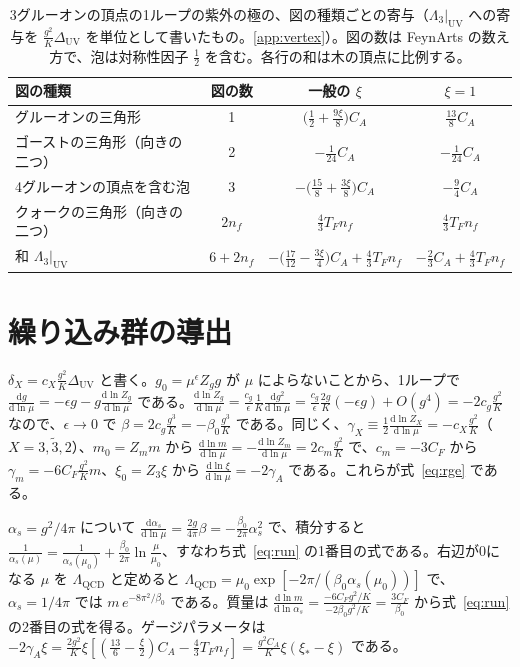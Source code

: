 \documentclass[a4paper,10pt]{ltjsarticle}
\newcommand{\dd}{\mathrm{d}}
\newcommand{\DUV}{\Delta_{\mathrm{UV}}}
\begin{document}
\begin{table}[htbp]
\centering\small
\caption{3グルーオンの頂点の1ループの紫外の極の、図の種類ごとの寄与（$\Lambda_3|_{\mathrm{UV}}$ への寄与を $\frac{g^2}K\DUV$ を単位として書いたもの。\ref{app:vertex}）。図の数は FeynArts の数え方で、泡は対称性因子 $\frac12$ を含む。各行の和は木の頂点に比例する。}
\label{tab:v3class}
\begin{tabular}{lccc}
\toprule
図の種類 & 図の数 & 一般の $\xi$ & $\xi=1$ \\
\midrule
グルーオンの三角形 & 1 & $\bigl(\frac12+\frac{9\xi}8\bigr)C_A$ & $\frac{13}8C_A$ \\
ゴーストの三角形（向きの二つ） & 2 & $-\frac1{24}C_A$ & $-\frac1{24}C_A$ \\
4グルーオンの頂点を含む泡 & 3 & $-\bigl(\frac{15}8+\frac{3\xi}8\bigr)C_A$ & $-\frac94C_A$ \\
クォークの三角形（向きの二つ） & $2n_f$ & $\frac43T_Fn_f$ & $\frac43T_Fn_f$ \\
\midrule
和 $\Lambda_3|_{\mathrm{UV}}$ & $6+2n_f$ & $-\bigl(\frac{17}{12}-\frac{3\xi}4\bigr)C_A+\frac43T_Fn_f$ & $-\frac23C_A+\frac43T_Fn_f$ \\
\bottomrule
\end{tabular}
\end{table}

\section{繰り込み群の導出}\label{app:rg}

$\delta_X=c_X\frac{g^2}{K}\DUV$ と書く。$g_0=\mu^\epsilon Z_gg$ が $\mu$ によらないことから、1ループで $\frac{\dd g}{\dd\ln\mu}=-\epsilon g-g\frac{\dd\ln Z_g}{\dd\ln\mu}$ である。$\frac{\dd\ln Z_g}{\dd\ln\mu}=\frac{c_g}{\epsilon}\frac{1}{K}\frac{\dd g^2}{\dd\ln\mu}=\frac{c_g}{\epsilon}\frac{2g}{K}(-\epsilon g)+O(g^4)=-2c_g\frac{g^2}K$ なので、$\epsilon\to0$ で $\beta=2c_g\frac{g^3}K=-\beta_0\frac{g^3}K$ である。同じく、$\gamma_X\equiv\frac12\frac{\dd\ln Z_X}{\dd\ln\mu}=-c_X\frac{g^2}K$（$X=3,\tilde3,2$）、$m_0=Z_mm$ から $\frac{\dd\ln m}{\dd\ln\mu}=-\frac{\dd\ln Z_m}{\dd\ln\mu}=2c_m\frac{g^2}K$ で、$c_m=-3C_F$ から $\gamma_m=-6C_F\frac{g^2}Km$、$\xi_0=Z_3\xi$ から $\frac{\dd\ln\xi}{\dd\ln\mu}=-2\gamma_A$ である。これらが式~\eqref{eq:rge} である。

$\alpha_s=g^2/4\pi$ について $\frac{\dd\alpha_s}{\dd\ln\mu}=\frac{2g}{4\pi}\beta=-\frac{\beta_0}{2\pi}\alpha_s^2$ で、積分すると $\frac1{\alpha_s(\mu)}=\frac1{\alpha_s(\mu_0)}+\frac{\beta_0}{2\pi}\ln\frac\mu{\mu_0}$、すなわち式~\eqref{eq:run} の1番目の式である。右辺が0になる $\mu$ を $\Lambda_{\mathrm{QCD}}$ と定めると $\Lambda_{\mathrm{QCD}}=\mu_0\exp[-2\pi/(\beta_0\alpha_s(\mu_0))]$ で、$\alpha_s=1/4\pi$ では $m\,e^{-8\pi^2/\beta_0}$ である。質量は $\frac{\dd\ln m}{\dd\ln\alpha_s}=\frac{-6C_Fg^2/K}{-2\beta_0g^2/K}=\frac{3C_F}{\beta_0}$ から式~\eqref{eq:run} の2番目の式を得る。ゲージパラメータは $-2\gamma_A\xi=\frac{2g^2}{K}\xi[(\frac{13}6-\frac\xi2)C_A-\frac43T_Fn_f]=\frac{g^2C_A}{K}\xi(\xi_*-\xi)$ である。
\end{document}
